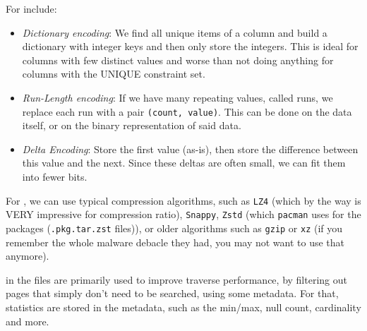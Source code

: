 For  include:
\begin{itemize}
    \item \textit{Dictionary encoding}: We find all unique items of a column and build a dictionary with integer keys and then only store the integers.
          This is ideal for columns with few distinct values and worse than not doing anything for columns with the UNIQUE constraint set.
    \item \textit{Run-Length encoding}: If we have many repeating values, called runs, we replace each run with a pair \texttt{(count, value)}.
          This can be done on the data itself, or on the binary representation of said data.
    \item \textit{Delta Encoding}: Store the first value (as-is), then store the difference between this value and the next.
          Since these deltas are often small, we can fit them into fewer bits.
\end{itemize}

For , we can use typical compression algorithms, such as \texttt{LZ4} (which by the way is VERY impressive for compression ratio),
\texttt{Snappy}, \texttt{Zstd} (which \texttt{pacman} uses for the packages (\texttt{.pkg.tar.zst} files)), or older algorithms such as \texttt{gzip} or \texttt{xz}
(if you remember the whole malware debacle they had, you may not want to use that anymore).


 in the files are primarily used to improve traverse performance, by filtering out pages that simply don't need to be searched, using some metadata.
For that, statistics are stored in the metadata, such as the min/max, null count, cardinality and more.

